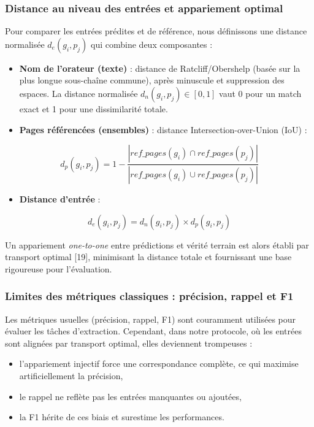 \subsubsection{Distance au niveau des entrées et appariement optimal}

Pour comparer les entrées prédites et de référence, nous définissons une distance normalisée $d_e(g_i, p_j)$ qui combine deux composantes :

\begin{itemize}
\item \textbf{Nom de l’orateur (texte)} : distance de Ratcliff/Obershelp (basée sur la plus longue sous-chaîne commune), après minuscule et suppression des espaces. La distance normalisée $d_n(g_i, p_j) \in [0,1]$ vaut 0 pour un match exact et 1 pour une dissimilarité totale.

\item \textbf{Pages référencées (ensembles)} : distance Intersection-over-Union (IoU) :

\end{itemize}
$$
d_p(g_i, p_j) = 1 - \frac{|ref\_pages(g_i) \cap ref\_pages(p_j)|}{|ref\_pages(g_i) \cup ref\_pages(p_j)|}
$$

\begin{itemize}
\item \textbf{Distance d’entrée} :

\end{itemize}
$$
d_e(g_i, p_j) = d_n(g_i, p_j) \times d_p(g_i, p_j)
$$

Un appariement \emph{one-to-one} entre prédictions et vérité terrain est alors établi par transport optimal [19], minimisant la distance totale et fournissant une base rigoureuse pour l’évaluation.

\subsubsection{Limites des métriques classiques : précision, rappel et F1}

Les métriques usuelles (précision, rappel, F1) sont couramment utilisées pour évaluer les tâches d’extraction. Cependant, dans notre protocole, où les entrées sont alignées par transport optimal, elles deviennent trompeuses :

\begin{itemize}
\item l’appariement injectif force une correspondance complète, ce qui maximise artificiellement la précision,
\item le rappel ne reflète pas les entrées manquantes ou ajoutées,
\item la F1 hérite de ces biais et surestime les performances.

\end{itemize}
